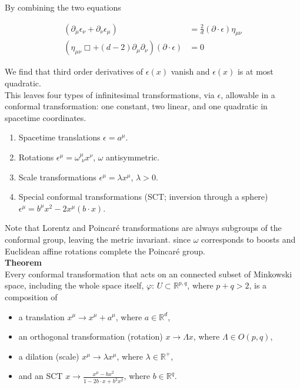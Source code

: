 \noindent By combining the two equations

\begin{align}
(\partial_\mu \epsilon_\nu + \partial_\nu \epsilon_\mu) &= \frac{2}{d} (\partial \cdot \epsilon) \eta_{\mu\nu} \\
(\eta_{\mu\nu} \Box + (d-2) \partial_\mu \partial_\nu) (\partial \cdot \epsilon) &= 0
\end{align}

\noindent We find that third order derivatives of $\epsilon(x)$ vanish and $\epsilon(x)$ is at most quadratic. \\

\noindent This leaves four types of infinitesimal transformations, via $\epsilon$, allowable in a conformal transformation: one constant, two linear, and one quadratic in spacetime coordinates.

\begin{enumerate}
\item Spacetime translations
	\subitem $\epsilon = a^\mu$.
\item Rotations
	\subitem  $\epsilon^\mu = \omega^\mu_{\,\,\nu} x^\nu$, $\omega$ antisymmetric.
\item Scale transformations
	\subitem $\epsilon^\mu = \lambda x^\mu$, $\lambda > 0$.
\item Special conformal transformations (SCT; inversion through a sphere)
	\subitem $\epsilon^\mu = b^\mu x^2 - 2 x^\mu (b \cdot x)$.
\end{enumerate}

\noindent Note that Lorentz and Poincar\'e transformations are always subgroups of the conformal group, leaving the metric invariant. since $\omega$ corresponds to boosts and Euclidean affine rotations complete the Poincar\'e group. \\

\noindent \textbf{Theorem} \\

\noindent Every conformal transformation that acts on an connected subset of Minkowski space, including the whole space itself, $\varphi : \, U \subset \mathbb{R}^{p,q}$, where $p+q > 2$, is a composition of 

\begin{itemize}
\item a translation
	\subitem $x^\mu \rightarrow x^\mu + a^\mu$, where $a \in \mathbb{R}^d$,
\item an orthogonal transformation (rotation)
	\subitem $x \rightarrow \Lambda x$, where $\Lambda \in O(p,q)$,
\item a dilation (scale)
	\subitem $x^\mu \rightarrow \lambda x^\mu$, where $\lambda \in \mathbb{R}^+$,
\item and an SCT
	\subitem $x \rightarrow \frac{x^\mu - b x^2 }{1-2b \cdot x + b^2 x^2}$, where $b \in \mathbb{R}^q$.
\end{itemize}

